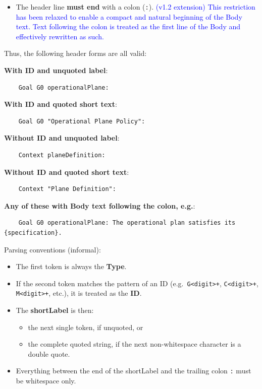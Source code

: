 \documentclass[11pt,twoside,a4paper]{article}
\begin{document}
\begin{itemize}[leftmargin=2em]
  \item The header line \textbf{must end} with a colon (\texttt{:}). 
  \textcolor{blue}{(v1.2 extension) This restriction has been relaxed to enable a compact and natural beginning of the Body text. Text following the colon is treated as the first line of the Body and effectively rewritten as such.}
\end{itemize}

Thus, the following header forms are all valid:

\textbf{With ID and unquoted label}:
\begin{verbatim}
    Goal G0 operationalPlane:
\end{verbatim}

\textbf{With ID and quoted short text}:
\begin{verbatim}
    Goal G0 "Operational Plane Policy":
\end{verbatim}

\textbf{Without ID and unquoted label}:
\begin{verbatim}
    Context planeDefinition:
\end{verbatim}

\textbf{Without ID and quoted short text}:
\begin{verbatim}
    Context "Plane Definition":
\end{verbatim}

\textbf{Any of these with Body text following the colon, e.g.}:
\begin{verbatim}
    Goal G0 operationalPlane: The operational plan satisfies its {specification}.
\end{verbatim}
Parsing conventions (informal):

\begin{itemize}[leftmargin=2em]
  \item The first token is always the \textbf{Type}.
  \item If the second token matches the pattern of an ID (e.g.\ \texttt{G<digit>+}, \texttt{C<digit>+}, \texttt{M<digit>+}, etc.), it is treated as the \textbf{ID}.
  \item The \textbf{shortLabel} is then:
  \begin{itemize}[leftmargin=1.5em]
    \item the next single token, if unquoted, or
    \item the complete quoted string, if the next non-whitespace character is a double quote.
  \end{itemize}
  \item Everything between the end of the shortLabel and the trailing colon \texttt{:} must be whitespace only.
\end{itemize}
\end{document}
